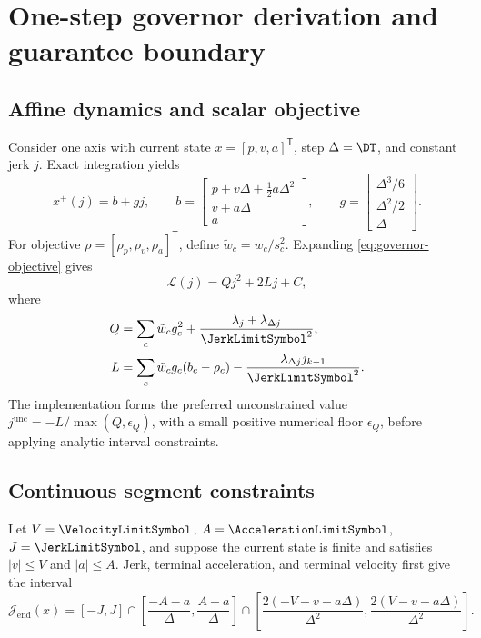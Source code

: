 \section{One-step governor derivation and guarantee boundary}
\label{app:governor-derivation}

\subsection{Affine dynamics and scalar objective}

Consider one axis with current state
\(x=[p,v,a]^{\mathsf T}\), step \(\Delta=\DT\), and constant jerk \(j\).
Exact integration yields
\begin{equation}
  x^+(j)=b+gj,
  \qquad
  b=
  \begin{bmatrix}
    p+v\Delta+\tfrac12a\Delta^2\\
    v+a\Delta\\
    a
  \end{bmatrix},
  \qquad
  g=
  \begin{bmatrix}
    \Delta^3/6\\ \Delta^2/2\\ \Delta
  \end{bmatrix}.
  \label{eq:appendix-affine-dynamics}
\end{equation}
For objective \(\rho=[\rho_p,\rho_v,\rho_a]^{\mathsf T}\), define
\(\tilde w_c=w_c/s_c^2\).  Expanding
\eqref{eq:governor-objective} gives
\begin{equation}
  \mathcal L(j)=Qj^2+2Lj+C,
  \label{eq:appendix-quadratic}
\end{equation}
where
\begin{align}
  Q &=
  \sum_c \tilde w_c g_c^2+
  \frac{\lambda_j+\lambda_{\Delta j}}{\JerkLimitSymbol^2},
  \label{eq:appendix-Q}\\
  L &=
  \sum_c \tilde w_c g_c(b_c-\rho_c)
  -\frac{\lambda_{\Delta j}j_{k-1}}{\JerkLimitSymbol^2}.
  \label{eq:appendix-L}
\end{align}
The implementation forms the preferred unconstrained value
\(j^{\mathrm{unc}}=-L/\max(Q,\epsilon_Q)\), with a small positive numerical
floor \(\epsilon_Q\), before applying analytic interval constraints.

\subsection{Continuous segment constraints}

Let \(V=\VelocityLimitSymbol\), \(A=\AccelerationLimitSymbol\),
\(J=\JerkLimitSymbol\), and suppose the current state is finite and satisfies
\(\lvert v\rvert\leq V\) and \(\lvert a\rvert\leq A\).  Jerk, terminal
acceleration, and terminal velocity first give the interval
\begin{equation}
  \mathcal J_{\mathrm{end}}(x)=
  [-J,J]
  \cap
  \left[\frac{-A-a}{\Delta},\frac{A-a}{\Delta}\right]
  \cap
  \left[
    \frac{2(-V-v-a\Delta)}{\Delta^2},
    \frac{2(V-v-a\Delta)}{\Delta^2}
  \right].
  \label{eq:endpoint-jerk-interval}
\end{equation}

